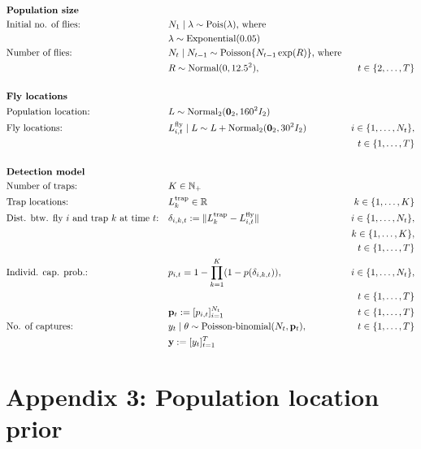 \documentclass[
]{book}
\begin{document}
\[
\renewcommand{\baselinestretch}{1}\normalsize
\begin{aligned}
&\textbf{Population size} \\
&\text{Initial no. of flies:} && N_1 \mid \lambda \sim \mathrm{Pois}(\lambda) \text{, where} \\
&&& \lambda \sim \mathrm{Exponential}(0.05) \\
& \text{Number of flies:}~ && N_t \mid N_{t-1}  \sim \mathrm{Poisson}\{ N_{t-1} \exp(R) \} \text{, where} \\ & &&R \sim \mathrm{Normal}(0, 12.5^2), & t \in \{2, \ldots, T \} \\
\\
&\textbf{Fly locations} \\
& \text{Population location:} ~ && L \sim \mathrm{Normal_2}(\mathbf 0_2, 160^2 I_2) \\
& \text{Fly locations:}~ && L_{i,t}^\text{fly} \mid L \sim L + \mathrm{Normal}_2(\mathbf 0_2, 30^2 I_2) & i \in \{1, \ldots, N_t\}, \\
  &&&& t \in \{1, \ldots, T\}\\
\\
&\textbf{Detection model} \\
& \text{Number of traps:}~ && K \in \mathbb N_+ \\
& \text{Trap locations:}~ && L_k^\text{trap} \in \mathbb R & k \in \{1, \ldots, K\} \\
& \text{Dist. btw. fly } i \text{ and trap } k \text{ at time } t \text{:} && \delta_{i,k,t} := \lVert L_k^\text{trap} - L_{i,t}^\text{fly} \rVert & i \in \{1, \ldots, N_t\}, \\
  &&&& k \in \{1, \ldots, K\}, \\
  &&&& t \in \{1, \ldots, T\}\\
& \text{Individ. cap. prob.:} && p_{i, t} = 1 - \prod_{k=1}^K (1 - p(\delta_{i,k,t})), & i \in \{1, \ldots, N_t\}, \\
  &&&& t \in \{1, \ldots, T\}\\
&  && \mathbf p_t := [p_{i,t}]_{i=1}^{N_t}  & t \in \{1, \ldots, T\} \\
&\text{No. of captures:}~ && y_t \mid \theta \sim \text{Poisson-binomial}(N_t, \mathbf p_t), & t \in \{1, \ldots, T\} \\
  &&& \mathbf y := [y_t]_{t=1}^T
\end{aligned}
\renewcommand{\baselinestretch}{1}\normalsize
\]

\hypertarget{appendix-3-population-location-prior}{%
\section{Appendix 3: Population location prior}\label{appendix-3-population-location-prior}}
\end{document}
